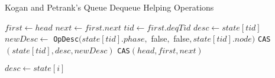 \begin{algorithm}[!ht]
    \centering
    \captionsetup{justification=centering}
    \caption{Kogan and Petrank's Queue Dequeue Helping Operations \cite{Kogan2011WaitFreeQueues}}
    \label{alg:kogan-petrank-dequeue-help}
    \scriptsize
    \begin{algorithmic}[1]
            \State $first \gets head$
            \State $next \gets first.next$
            \State $tid \gets first.deqTid$ 
                \State $desc \gets state[tid]$
                    \State $newDesc \gets$ \texttt{OpDesc}$(state[tid].phase,$ false$,$ false$, state[tid].node)$
                    \State \texttt{CAS}$(state[tid], desc, newDesc)$ 
                    \State \texttt{CAS}$(head, first, next)$ 
                \EndIf
            \EndIf
        \EndProcedure
        
        \State
        
                \State $desc \gets state[i]$
                        \State {}
                    \Else
                        \State {}
                    \EndIf
                \EndIf
            \EndFor
        \EndProcedure
    \end{algorithmic}
\end{algorithm}

